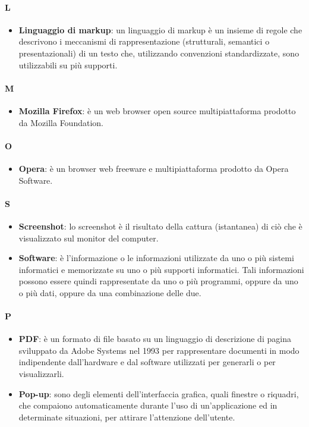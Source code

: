 \paragraph{L}
\begin{itemize}
	\item[] \textbf{Linguaggio di markup}: un linguaggio di markup è un insieme di regole che descrivono i meccanismi di rappresentazione (strutturali, semantici o presentazionali) di un testo che, utilizzando convenzioni standardizzate, sono utilizzabili su più supporti.
\end{itemize}
\newpage

\paragraph{M}
\begin{itemize}
	\item[] \textbf{Mozilla Firefox}: è un web browser open source multipiattaforma prodotto da Mozilla Foundation.
\end{itemize}
\newpage

\paragraph{O}
\begin{itemize}
	\item[] \textbf{Opera}: è un browser web freeware e multipiattaforma prodotto da Opera Software.
\end{itemize}
\newpage

\paragraph{S}
\begin{itemize}
	\item[] \textbf{Screenshot}: lo screenshot è il risultato della cattura (istantanea) di ciò che è visualizzato sul monitor del computer.
	\item[] \textbf{Software}: è l'informazione o le informazioni utilizzate da uno o più sistemi informatici e memorizzate su uno o più supporti informatici. Tali informazioni possono essere quindi rappresentate da uno o più programmi, oppure da uno o più dati, oppure da una combinazione delle due.
\end{itemize}
\newpage


\paragraph{P}
\begin{itemize}
	\item[] \textbf{PDF}:  è un formato di file basato su un linguaggio di descrizione di pagina sviluppato da Adobe Systems nel 1993 per rappresentare documenti in modo indipendente dall'hardware e dal software utilizzati per generarli o per visualizzarli.
	\item[] \textbf{Pop-up}: sono degli elementi dell'interfaccia grafica, quali finestre o riquadri, che compaiono automaticamente durante l'uso di un'applicazione ed in determinate situazioni, per attirare l'attenzione dell'utente.
\end{itemize}
\newpage

